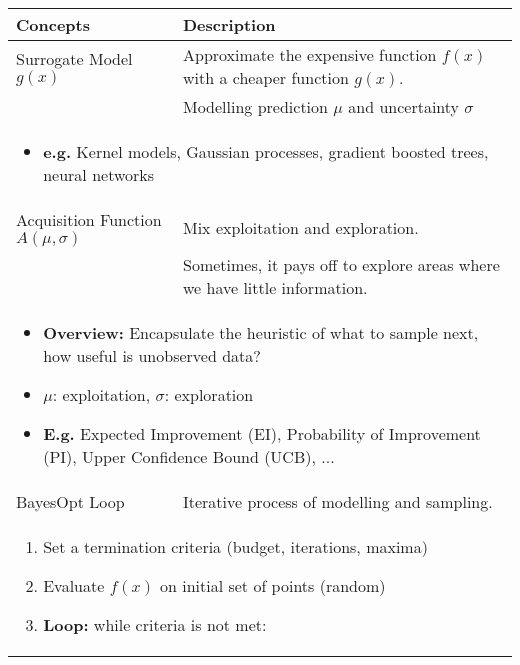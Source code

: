 \begin{summary}
    \begin{center}
        \begin{tabular}{ll}
            \toprule
            \textbf{Concepts} & \textbf{Description} \\
            \midrule
            Surrogate Model $g(x)$ & Approximate the expensive function $f(x)$ with a cheaper function $g(x)$. \\
            & Modelling prediction $\mu$ and uncertainty $\sigma$ \\
            \multicolumn{2}{p{\linewidth}}{
                \begin{itemize}
                    \item \textbf{e.g.} Kernel models, Gaussian processes, gradient boosted trees, neural networks
                \end{itemize}
            } \\
            \midrule
            Acquisition Function $A(\mu,\sigma)$ & Mix exploitation and exploration. \\
            & Sometimes, it pays off to explore areas where we have little information. \\
            \multicolumn{2}{p{\linewidth}}{
                \begin{itemize}
                    \item \textbf{Overview:} Encapsulate the heuristic of what to sample next, how useful is unobserved data?
                    \item $\mu$: exploitation, $\sigma$: exploration 
                    \item \textbf{E.g.} Expected Improvement (EI), Probability of Improvement (PI), Upper Confidence Bound (UCB), ...
                \end{itemize}
            } \\  
            \midrule 
            BayesOpt Loop & Iterative process of modelling and sampling. \\
            \multicolumn{2}{p{\linewidth}}{
                \begin{enumerate}
                    \item Set a termination criteria (budget, iterations, maxima)
                    \item Evaluate $f(x)$ on initial set of points (random)
                    \item \textbf{Loop:} while criteria is not met:
                    \begin{enumerate}

\end{enumerate}
\end{enumerate}}
\end{tabular}
\end{center}
\end{summary}
